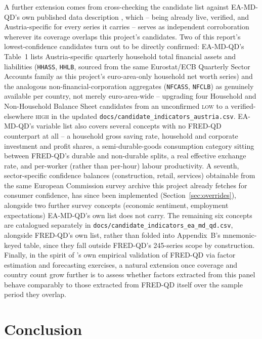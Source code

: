 \documentclass[11pt]{article}
\begin{document}
A further extension comes from cross-checking the candidate list against
EA-MD-QD's own published data description
\citep{barigozzi2026eamdqdpaper}, which -- being already live, verified,
and Austria-specific for every series it carries -- serves as independent
corroboration wherever its coverage overlaps this project's candidates.
Two of this report's lowest-confidence candidates turn out to be directly
confirmed: EA-MD-QD's Table~1 lists Austria-specific quarterly household
total financial assets and liabilities (\texttt{HHASS}, \texttt{HHLB},
sourced from the same Eurostat/ECB Quarterly Sector Accounts family as
this project's euro-area-only household net worth series) and the
analogous non-financial-corporation aggregates (\texttt{NFCASS},
\texttt{NFCLB}) as genuinely available per country, not merely
euro-area-wide -- upgrading four Household and Non-Household
Balance Sheet candidates from an unconfirmed \textsc{low} to a
verified-elsewhere \textsc{high} in the updated
\texttt{docs/\allowbreak{}candidate\_\allowbreak{}indicators\_\allowbreak{}austria.csv}. EA-MD-QD's variable
list also covers several concepts with no FRED-QD counterpart at all --
a household gross saving rate, household and corporate investment and
profit shares, a semi-durable-goods consumption category sitting between
FRED-QD's durable and non-durable splits, a real effective exchange
rate, and per-worker (rather than per-hour) labour productivity. A
seventh, sector-specific confidence balances (construction, retail,
services) obtainable from the same European Commission survey archive
this project already fetches for consumer confidence, has since been
implemented (Section~\ref{sec:overrides}), alongside two further survey
concepts (economic sentiment, employment expectations) EA-MD-QD's own
list does not carry. The remaining six
concepts are catalogued separately in
\texttt{docs/\allowbreak{}candidate\_\allowbreak{}indicators\_\allowbreak{}ea\_md\_qd.csv}, alongside FRED-QD's
own list, rather than folded into Appendix~B's mnemonic-keyed table, since
they fall outside FRED-QD's 245-series scope by construction. Finally, in
the spirit of \citet{mccracken2020fred}'s own
empirical validation of FRED-QD via factor estimation and forecasting
exercises, a natural extension once coverage and country count grow
further is to assess whether factors extracted from this panel behave
comparably to those extracted from FRED-QD itself over the sample period
they overlap.

\section{Conclusion}
\label{sec:conclusion}
\end{document}
